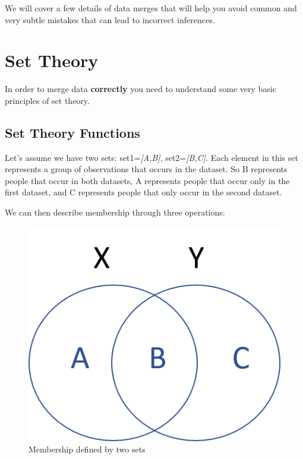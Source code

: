 \documentclass[]{book}
\theoremstyle{definition}
\theoremstyle{definition}
\theoremstyle{definition}
\theoremstyle{remark}
\begin{document}
We will cover a few details of data merges that will help you avoid
common and very subtle mistakes that can lead to incorrect inferences.

\hypertarget{set-theory}{%
\section{Set Theory}\label{set-theory}}

In order to merge data \textbf{correctly} you need to understand some
very basic principles of set theory.

\hypertarget{set-theory-functions}{%
\subsection{Set Theory Functions}\label{set-theory-functions}}

Let's assume we have two sets: set1=\emph{{[}A,B{]}},
set2=\emph{{[}B,C{]}}. Each element in this set represents a group of
observations that occurs in the dataset. So B represents people that
occur in both datasets, A represents people that occur only in the first
dataset, and C represents people that only occur in the second dataset.

We can then describe membership through three operations:

\begin{figure}

{\centering \includegraphics[width=0.7\linewidth]{figures/xy} 

}

\caption{Membership defined by two sets}\label{fig:unnamed-chunk-108}
\end{figure}
\end{document}
